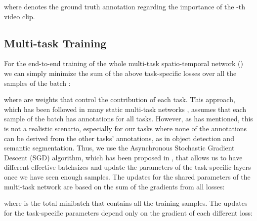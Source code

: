 \documentclass[10pt,twocolumn,letterpaper]{article}
\begin{document}
where  denotes the ground truth annotation regarding the importance of the -th video clip.   

\subsection{Multi-task Training}

For the end-to-end training of the whole multi-task spatio-temporal network () we can simply minimize the sum of the above task-specific losses over all the samples of the batch :

where  are weights that control the contribution of each task. This approach, which has been followed in many static multi-task networks \cite{dai2016instance,eigen2015predicting,gkioxari2015contextual}, assumes that each sample of the batch has annotations for all tasks. However, as \cite{kokkinos2017ubernet} has mentioned, this is not a realistic scenario, especially for our tasks where none of the annotations can be derived  from the other tasks' annotations, as in object detection and semantic segmentation. Thus, we use the Asynchronous Stochastic Gradient Descent (SGD) algorithm, which has been proposed in \cite{kokkinos2017ubernet}, that allows us to have different effective batchsizes  and update the parameters of the task-specific layers once we have seen enough samples. The updates for the shared parameters   of the multi-task network are based on the sum of the gradients from all losses:
 
where  is the total minibatch that contains all the training samples. The updates for the task-specific parameters depend only on the gradient of each different loss:
\end{document}
